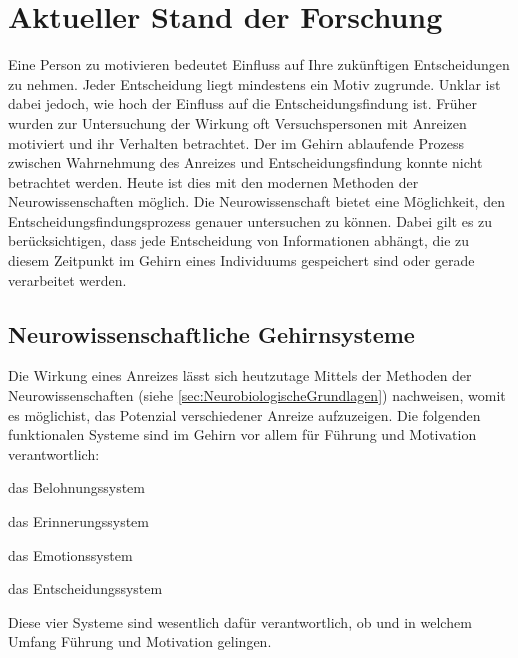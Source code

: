 \section{Aktueller Stand der Forschung}
Eine Person zu motivieren bedeutet Einfluss auf Ihre zukünftigen Entscheidungen zu nehmen. Jeder Entscheidung liegt mindestens ein Motiv zugrunde. Unklar ist dabei jedoch, wie hoch der Einfluss auf die Entscheidungsfindung ist. Früher wurden zur Untersuchung der Wirkung oft Versuchspersonen mit Anreizen motiviert und ihr Verhalten betrachtet. Der im Gehirn ablaufende Prozess zwischen Wahrnehmung des Anreizes und Entscheidungsfindung konnte nicht betrachtet werden. Heute ist dies mit den modernen Methoden der Neurowissenschaften möglich. \citep[S. 59]{Nowka.2013}
Die Neurowissenschaft bietet eine Möglichkeit, den Entscheidungsfindungsprozess genauer untersuchen zu können. Dabei gilt es zu berücksichtigen, dass jede Entscheidung von Informationen abhängt, die zu diesem Zeitpunkt im Gehirn eines Individuums gespeichert sind oder gerade verarbeitet werden. \citep[S. 60]{Nowka.2013}

\subsection{Neurowissenschaftliche Gehirnsysteme}
Die Wirkung eines Anreizes lässt sich heutzutage Mittels der Methoden der Neurowissenschaften (siehe \ref{sec:NeurobiologischeGrundlagen}) nachweisen, womit es möglichist, das Potenzial verschiedener Anreize aufzuzeigen. Die folgenden funktionalen Systeme sind im Gehirn vor allem für Führung und Motivation verantwortlich: 

\begin{APAitemize}
\item das Belohnungssystem
\item das Erinnerungssystem
\item das Emotionssystem
\item das Entscheidungssystem
\end{APAitemize}

\glqq Diese vier Systeme sind wesentlich dafür verantwortlich, ob und in welchem Umfang Führung und Motivation gelingen.\grqq \citep[S. 16]{Seelbach.2011}

